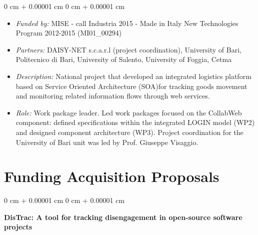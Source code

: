 \documentclass[10pt, a4paper]{article}
\newenvironment{highlights}{
    \begin{itemize}[
        topsep=0.10 cm,
        parsep=0.10 cm,
        partopsep=0pt,
        itemsep=0pt,
        leftmargin=0 cm + 10pt
    ]
}{
    \end{itemize}
} %
\newenvironment{onecolentry}{
    \begin{adjustwidth}{
        0 cm + 0.00001 cm
    }{
        0 cm + 0.00001 cm
    }
}{
    \end{adjustwidth}
} %
\begin{document}
        \vspace{0.10 cm}
        \begin{onecolentry}
            \begin{highlights}
                \item \textit{Funded by:} MISE - call Industria 2015 - Made in Italy New Technologies Program 2012-2015 (MI01\_00294)
                \item \textit{Partners:} DAISY-NET s.c.a.r.l (project coordination), University of Bari, Politecnico di Bari, University of Salento, University of Foggia, Cetma
                \item \textit{Description:} National project that developed an integrated logistics platform based on Service Oriented Architecture (SOA)for tracking goods movement and monitoring related information flows through web services.
                \item \textit{Role:} Work package leader. Led work packages focused on the CollabWeb component: defined specifications within the integrated LOGIN model (WP2) and designed component architecture (WP3). Project coordination for the University of Bari unit was led by Prof. Giuseppe Visaggio.
            \end{highlights}
        \end{onecolentry}



    
    \section{Funding Acquisition Proposals}



        
        \begin{onecolentry}
            \textbf{DisTrac: A tool for tracking disengagement in open-source software projects}\end{onecolentry}
\end{document}
